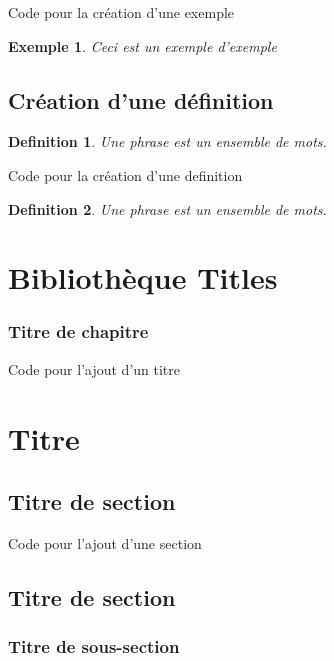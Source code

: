 \documentclass[12pt]{report}
\newtheorem{exemple}{Exemple}
\newtheorem{definition}{Definition}%
\begin{document}
\begin{Latex}{Code pour la création d'une exemple}
\begin{exemple}
    Ceci est un exemple d'exemple
\end{exemple}
\end{Latex}

\section{Création d'une définition}

\begin{definition}
    Une phrase est un ensemble de mots.
\end{definition}

\begin{Latex}{Code pour la création d'une definition}
\begin{definition}
    Une phrase est un ensemble de mots.
\end{definition}
\end{Latex}\chapter{Bibliothèque Titles}

\subsection{Titre de chapitre}
\begin{Latex}{Code pour l'ajout d'un titre}
  \chapter{Titre}
\end{Latex}

\section{Titre de section}
\begin{Latex}{Code pour l'ajout d'une section}
  \section{Titre de section}
\end{Latex}

\subsection{Titre de sous-section}
\end{document}
